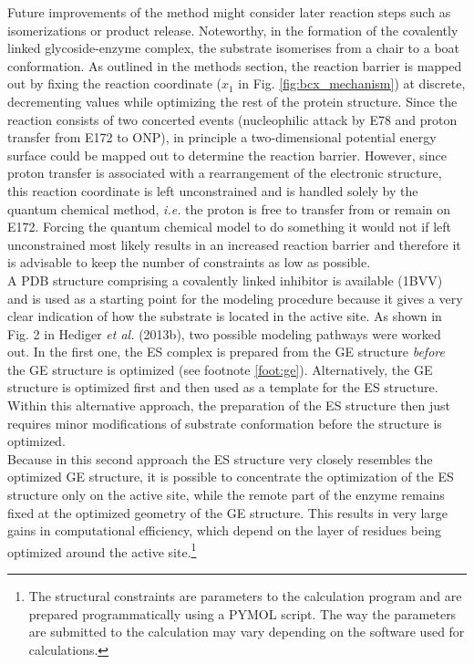 Future improvements of the method might consider later reaction steps such as isomerizations or product release.
Noteworthy, in the formation of the covalently linked glycoside-enzyme complex, the substrate isomerises from a chair to a boat conformation.
As outlined in the methods section, the reaction barrier is mapped out by fixing the reaction coordinate ($x_1$ in Fig. \ref{fig:bcx_mechanism}) at discrete, decrementing values while optimizing the rest of the protein structure.
Since the reaction consists of two concerted events (nucleophilic attack by E78 and proton transfer from E172 to ONP), in principle a two-dimensional potential energy surface could be mapped out to determine the reaction barrier.
However, since proton transfer is associated with a rearrangement of the electronic structure, this reaction coordinate is left unconstrained and is handled solely by the quantum chemical method, \textit{i.e.} the proton is free to transfer from or remain on E172.
Forcing the quantum chemical model to do something it would not if left unconstrained most likely results in an increased reaction barrier and therefore it is advisable to keep the number of constraints as low as possible.\\
A PDB structure comprising a covalently linked inhibitor is available (1BVV) and is used as a starting point for the modeling procedure because it gives a very clear indication of how the substrate is located in the active site.
As shown in Fig. 2 in Hediger \textit{et al.} (2013b), two possible modeling pathways were worked out.
In the first one, the ES complex is prepared from the GE structure \textit{before} the GE structure is optimized (see footnote \ref{foot:ge}).
Alternatively, the GE structure is optimized first and then used as a template for the ES structure.
Within this alternative approach, the preparation of the ES structure then just requires minor modifications of substrate conformation before the structure is optimized.\\
Because in this second approach the ES structure very closely resembles the optimized GE structure, it is possible to concentrate the optimization of the ES structure only on the active site, while the remote part of the enzyme remains fixed at the optimized geometry of the GE structure.
This results in very large gains in computational efficiency, which depend on the layer of residues being optimized around the active site.\footnote{The structural constraints are parameters to the calculation program and are prepared programmatically using a PYMOL script. The way the parameters are submitted to the calculation may vary depending on the software used for calculations.}
